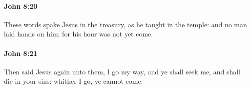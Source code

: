 		\paragraph{John 8:20} %
			\label{JOHN-8-20}

			These words spake Jesus in the treasury, as he taught in the temple: and no man laid hands on him; for his hour was not yet come.

			\begin{framed}
				\scriptsize
				\begin{compactdesc}
					\item[SBLG] 
				\end{compactdesc}
			\end{framed}

		\paragraph{John 8:21} %
			\label{JOHN-8-21}

			Then said Jesus again unto them, I go my way, and ye shall seek me, and shall die in your sins: whither I go, ye cannot come.

